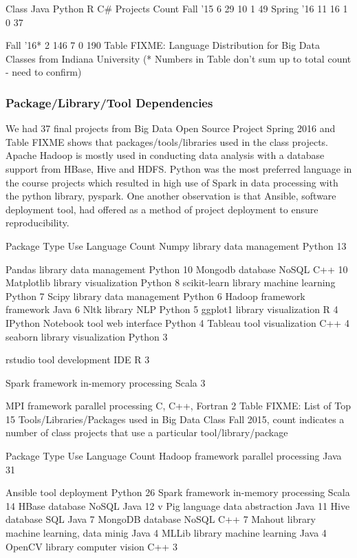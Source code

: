 \documentclass[9pt,twocolumn,twoside]{styles/osajnl}
\begin{document}
Class
	Java
	Python
	R
	C\#
	Projects Count
	Fall ’15
	6
	29
	10
	1
	49
	Spring ’16
	11
	16
	1
	0
	37

	Fall ’16*
	2
	146
	7
	0
	190
	Table  FIXME:  Language Distribution for Big Data Classes from Indiana University
(* Numbers in Table don’t sum up to total count - need to confirm)


\subsubsection{Package/Library/Tool Dependencies}

We had 37 final projects from Big Data Open Source Project Spring 2016
and Table FIXME shows that packages/tools/libraries used in the class
projects. Apache Hadoop is mostly used in conducting data analysis
with a database support from HBase, Hive and HDFS. Python was the most
preferred language in the course projects which resulted in high use
of Spark in data processing with the python library, pyspark. One
another observation is that Ansible, software deployment tool, had
offered as a method of project deployment to ensure reproducibility.





Package
	Type
	Use
	Language
	Count
	Numpy
	library
	data management
	Python
	13

	Pandas
	library
	data management
	Python
	10
	Mongodb
	database
	NoSQL
	C++
	10
	Matplotlib
	library
	visualization
	Python
	8
	scikit-learn
	library
	machine learning
	Python
	7
	Scipy
	library
	data management
	Python
	6
	Hadoop
	framework
	framework
	Java
	6
	Nltk
	library
	NLP
	Python
	5
	ggplot1
	library
	visualization
	R
	4
	IPython Notebook
	tool
	web interface
	Python
	4
	Tableau
	tool
	visualization
	C++
	4
	seaborn
	library
	visualization
	Python
	3

	rstudio
	tool
	development IDE
	R
	3

	Spark
	framework
	in-memory processing
	Scala
	3

	MPI
	framework
	parallel processing
	C, C++, Fortran
	2
	Table FIXME: List of Top 15 Tools/Libraries/Packages used in Big Data Class Fall 2015, count indicates a number of class projects that use a particular tool/library/package


Package
	Type
	Use
	Language
	Count
	Hadoop
	framework
	parallel processing
	Java
	31

	Ansible
	tool
	deployment
	Python
	26
	Spark
	framework
	in-memory processing
	Scala
	14
	HBase
	database
	NoSQL
	Java
	12
v	Pig
	language
	data abstraction
	Java
	11
	Hive
	database
	SQL
	Java
	7
	MongoDB
	database
	NoSQL
	C++
	7
	Mahout
	library
	machine learning, data minig
	Java
	4
	MLLib
	library
	machine learning
	Java
	4
	OpenCV
	library
	computer vision
	C++
	3
\end{document}
